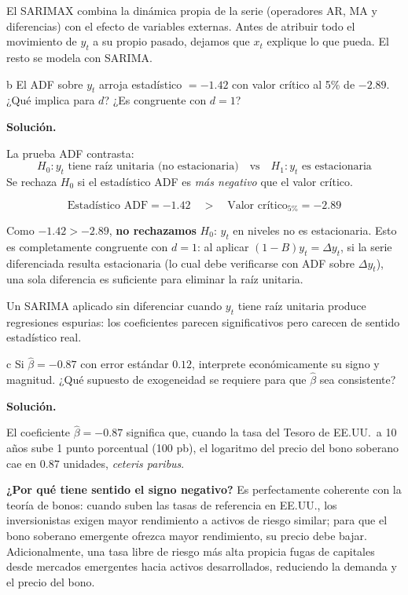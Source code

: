 \documentclass[11pt,a4paper]{article}
\begin{document}
\begin{cajaHallazgo}
El SARIMAX combina la dinámica propia de la serie (operadores AR, MA y diferencias) con el efecto de variables externas. Antes de atribuir todo el movimiento de $y_t$ a su propio pasado, dejamos que $x_t$ explique lo que pueda. El resto se modela con SARIMA.
\end{cajaHallazgo}

\begin{cajaInciso}{b}
El ADF sobre $y_t$ arroja estadístico $= -1.42$ con valor crítico al 5\% de $-2.89$. ¿Qué implica para $d$? ¿Es congruente con $d=1$?
\end{cajaInciso}

\textbf{Solución.}

La prueba ADF contrasta:
\[
H_0: y_t \text{ tiene raíz unitaria (no estacionaria)} \quad \text{vs} \quad H_1: y_t \text{ es estacionaria}
\]
Se rechaza $H_0$ si el estadístico ADF es \emph{más negativo} que el valor crítico.

\[
\text{Estadístico ADF} = -1.42 \quad > \quad \text{Valor crítico}_{5\%} = -2.89
\]

Como $-1.42 > -2.89$, \textbf{no rechazamos} $H_0$: $y_t$ en niveles no es estacionaria. Esto es completamente congruente con $d=1$: al aplicar $(1-B)y_t = \Delta y_t$, si la serie diferenciada resulta estacionaria (lo cual debe verificarse con ADF sobre $\Delta y_t$), una sola diferencia es suficiente para eliminar la raíz unitaria.

Un SARIMA aplicado sin diferenciar cuando $y_t$ tiene raíz unitaria produce regresiones espurias: los coeficientes parecen significativos pero carecen de sentido estadístico real.

\begin{cajaInciso}{c}
Si $\hat{\beta} = -0.87$ con error estándar $0.12$, interprete económicamente su signo y magnitud. ¿Qué supuesto de exogeneidad se requiere para que $\hat{\beta}$ sea consistente?
\end{cajaInciso}

\textbf{Solución.}

El coeficiente $\hat{\beta} = -0.87$ significa que, cuando la tasa del Tesoro de EE.UU.\ a 10 años sube 1 punto porcentual (100 pb), el logaritmo del precio del bono soberano cae en $0.87$ unidades, \emph{ceteris paribus}.

\textbf{¿Por qué tiene sentido el signo negativo?} Es perfectamente coherente con la teoría de bonos: cuando suben las tasas de referencia en EE.UU., los inversionistas exigen mayor rendimiento a activos de riesgo similar; para que el bono soberano emergente ofrezca mayor rendimiento, su precio debe bajar. Adicionalmente, una tasa libre de riesgo más alta propicia fugas de capitales desde mercados emergentes hacia activos desarrollados, reduciendo la demanda y el precio del bono.
\end{document}
